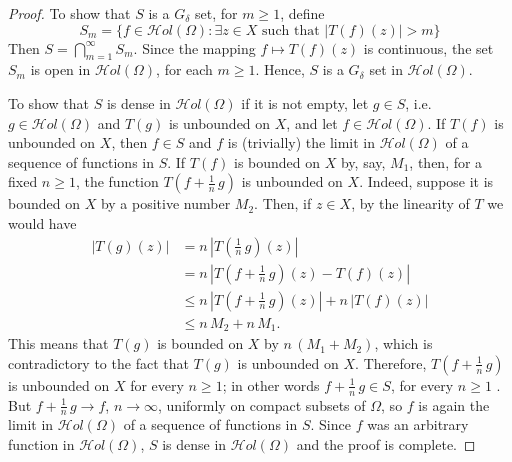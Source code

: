 \documentclass[11pt,twoside,a4paper]{article}
\theoremstyle{remark}
\def\d{\delta}
\newcommand{\holo}{{\mathcal Hol}(\Omega)}
\begin{document}
\begin{proof}
  \par
To show that $S$ is a $G_\d$ set, for $m \geq 1$, define
\begin{equation*}
  S_m=\{f \in \holo: \exists z \in X \text{ such that } |T(f)(z)|>m \}
\end{equation*}
Then $S= \bigcap\limits_{m=1}^{\infty} S_m$. Since the mapping $f \mapsto T(f)(z)$ is continuous, the set $S_m$ is open in $\holo$, for each $m \geq 1$. Hence, $S$ is a $G_\d$ set in $\holo$.
\par
To show that $S$ is dense in $\holo$ if it is not empty, let $g \in S$, i.e. $g \in \holo$ and $T(g)$ is unbounded on $X$, and let $f \in \holo$. If $T(f)$ is unbounded on $X$, then $f \in S$ and $f$ is (trivially) the limit in $\holo$ of a sequence of functions in $S$. If $T(f)$ is bounded on $X$ by, say, $M_1$, then, for a fixed $n \geq 1$, the function $T(f+\frac{1}{n} \hspace{2pt}g)$ is unbounded on $X$. Indeed, suppose it is bounded on $X$ by a positive number $M_2$. Then, if $z \in X$, by the linearity of $T$ we would have
\begin{align*}
  |T(g)(z)| & = n \hspace{2pt} |T(\frac{1}{n} \hspace{2pt} g)(z)| \\
            & = n \hspace{2pt} |T(f+\frac{1}{n} \hspace{2pt} g)(z)- T(f)(z)|\\
            &\leq n \hspace{2pt} |T(f+\frac{1}{n} \hspace{2pt} g)(z)|+n \hspace{2pt}|T(f)(z)|\\
            &\leq n \hspace{2pt} M_2 +n \hspace{2pt} M_1.
\end{align*}
This means that $T(g)$ is bounded on $X$ by $n \hspace{2pt}(M_1+M_2)$, which is contradictory to the fact that $T(g)$ is unbounded on $X$. Therefore, $T(f+\frac{1}{n} \hspace{2pt}g)$ is unbounded on $X$ for every $n \geq 1$; in other words $f+\frac{1}{n} \hspace{2pt}g \in S$, for every $n \geq 1$ . But $f+\frac{1}{n} \hspace{2pt}g \longrightarrow f$, $n \rightarrow \infty$, uniformly on compact subsets of $\Omega$, so $f$ is again the limit in $\holo$ of a sequence of functions in $S$. Since $f$ was an arbitrary function in $\holo$, $S$ is dense in $\holo$ and the proof is complete.
\end{proof}
\end{document}
